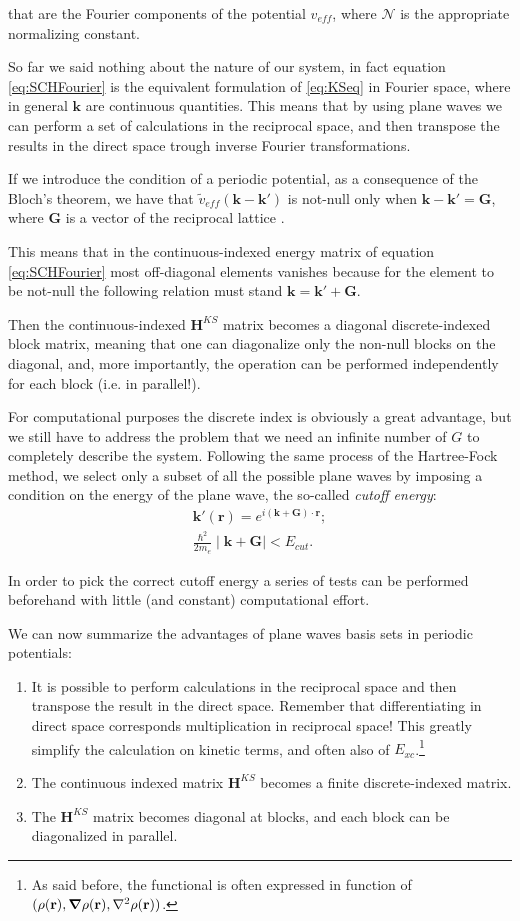 \documentclass[a4paper,12pt]{article}
\newcommand\mf[1]{\mathbf{#1}}
\newcommand\dens{\rho(\mathbf{r})}
\newcommand\erre{\mathbf{r}}
\begin{document}
that are the Fourier components of the potential $v_{eff}$, where $\mathcal{N}$ is the appropriate normalizing constant.

So far we said nothing about the nature of our system, in fact equation \eqref{eq:SCHFourier} is the equivalent formulation of \eqref{eq:KSeq} in Fourier space, where in general $\mf{k}$ are continuous quantities.
This means that by using plane waves we can perform a set of calculations in the reciprocal space, and then transpose the results in the direct space trough inverse Fourier transformations.

If we introduce the condition of a periodic potential, as a consequence of the Bloch's theorem, we have that $\tilde{v}_{eff}(\mf{k} - \mf{k'})$ is not-null only when $\mf{k} - \mf{k'} = \mf{G}$, where $\mf{G}$ is a vector of the reciprocal lattice \cite{Martin}.

This means that in the continuous-indexed energy matrix of equation \eqref{eq:SCHFourier} most off-diagonal elements vanishes because for the element to be not-null the following relation must stand $\mf{k} = \mf{k'} + \mf{G}$.

Then the continuous-indexed $\mf{H}^{KS}$ matrix becomes a diagonal discrete-indexed block matrix, meaning that one can diagonalize only the non-null blocks on the diagonal, and, more importantly, the operation can be performed independently for each block (i.e. in parallel!).

For computational purposes the discrete index is obviously a great advantage, but we still have to address the problem that we need an infinite number of $G$ to completely describe the system.
Following the same process of the Hartree-Fock method, we select only a subset of all the possible plane waves by imposing a condition on the energy of the plane wave, the so-called \textit{cutoff energy}:
\begin{align}
	\mf{k'}(\erre) = e^{i(\mf{k + G}) \cdot \erre};\\
	\frac{\hbar^2}{2m_e}\mid \mf{k + G} \mid < E_{cut}. \label{eq:cutoffEnergy}
\end{align}

In order to pick the correct cutoff energy a series of tests can be performed beforehand with little (and constant) computational effort.

We can now summarize the advantages of plane waves basis sets in periodic potentials:
\begin{enumerate}
	\item It is possible to perform calculations in the reciprocal space and then transpose the result in the direct space. Remember that differentiating in direct space corresponds multiplication in reciprocal space! This greatly simplify the calculation on kinetic terms, and often also of $E_{xc}$.\footnote{As said before, the functional is often expressed in function of $(\dens,\grad\dens,\nabla^2\dens)$.}
	\item The continuous indexed matrix $\mf{H}^{KS}$ becomes a finite discrete-indexed matrix.
	\item The $\mf{H}^{KS}$ matrix becomes diagonal at blocks, and each block can be diagonalized in parallel. \label{en:Kpoints}
\end{enumerate}
\end{document}
